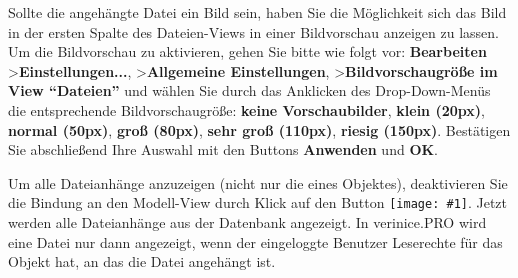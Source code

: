 \documentclass[a4paper,10pt]{book}
\newcommand{\icon}[1]{\texttt{[image: \#1]}}
\begin{document}
Sollte die angehängte Datei ein Bild sein, haben Sie die Möglichkeit sich das Bild in der ersten Spalte des Dateien-Views in einer Bildvorschau anzeigen zu lassen. Um die Bildvorschau zu aktivieren, gehen Sie bitte wie folgt vor: \textbf{Bearbeiten} \textgreater \textbf{Einstellungen...},
\textgreater \textbf{Allgemeine Einstellungen}, \textgreater \textbf{Bildvorschaugröße im View ``Dateien''} und wählen Sie durch das Anklicken des Drop-Down-Menüs
die entsprechende Bildvorschaugröße: \textbf{keine Vorschaubilder}, \textbf{klein (20px)}, \textbf{normal (50px)}, \textbf{groß (80px)}, \textbf{sehr groß (110px)},
\textbf{riesig (150px)}. Bestätigen Sie abschließend Ihre Auswahl mit den Buttons \textbf{Anwenden} und \textbf{OK}.

Um alle Dateianhänge anzuzeigen (nicht nur die eines Objektes), deaktivieren Sie die Bindung an den Modell-View durch Klick auf den Button \icon{Icon/Mitarbeiter.png}. Jetzt werden alle Dateianhänge aus der Datenbank angezeigt. In verinice.PRO wird eine Datei nur dann angezeigt, wenn der eingeloggte Benutzer Leserechte für das Objekt hat, an das die Datei angehängt ist.
\end{document}
